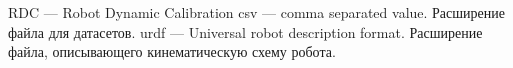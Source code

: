 \newpage
\begin{abbreviations}



RDC --- Robot Dynamic Calibration
csv --- comma separated value. Расширение файла для датасетов.
urdf --- Universal robot description format. Расширение файла, описывающего кинематическую схему робота.

\end{abbreviations}